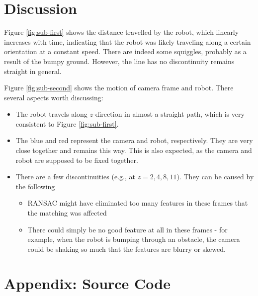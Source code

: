 \documentclass{article} %
\begin{document}
\clearpage
\section{Discussion} %
Figure \ref{fig:sub-first} shows the distance travelled by the robot, which linearly increases with time, indicating that the robot was likely traveling along a certain orientation at a constant speed. There are indeed some squiggles, probably as a result of the bumpy ground. However, the line has no discontinuity remains straight in general.

Figure \ref{fig:sub-second} shows the motion of camera frame and robot. There several aspects worth discussing:
\begin{itemize}
  \item The robot travels along $z$-direction in almost a straight path, which is very consistent to Figure \ref{fig:sub-first}.
  \item The blue and red represent the camera and robot, respectively. They are very close together and remains this way. This is also expected, as the camera and robot are supposed to be fixed together.
  \item There are a few discontinuities (e.g., at $z=2, 4, 8, 11$). They can be caused by the following
  \begin{itemize}
    \item RANSAC might have eliminated too many features in these frames that the matching was affected
    \item There could simply be no good feature at all in these frames - for example, when the robot is bumping through an obstacle, the camera could be shaking so much that the features are blurry or skewed.
  \end{itemize}
\end{itemize}

\clearpage
\section*{Appendix: Source Code}

\end{document}
